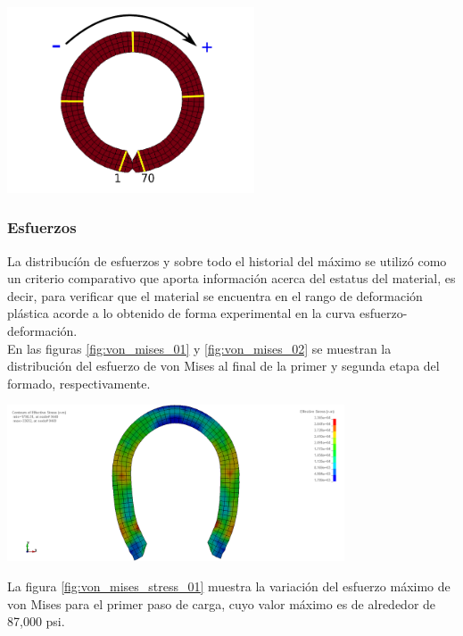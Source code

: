 \begin{center}
\includegraphics[width=0.55\textwidth]{src/ch4/numerate.pdf}
\label{fig:numerate}
\end{center}

\subsubsection{Esfuerzos}

La distribucíón de esfuerzos y sobre todo el historial del máximo se utilizó como 
un criterio comparativo  que aporta información acerca del estatus del material, 
es decir, para verificar que el material se encuentra en el rango de deformación 
plástica acorde a lo obtenido de forma experimental en la curva esfuerzo-deformación.\\

En las figuras \ref{fig:von_mises_01} y \ref{fig:von_mises_02} se muestran la 
distribución del esfuerzo de von Mises al final de la primer y segunda etapa 
del formado, respectivamente. 

\begin{center}
\includegraphics[width=0.75\textwidth]{src/ch4/von_mises_01.png}
\label{fig:von_mises_01}
\end{center}

La figura \ref{fig:von_mises_stress_01} muestra la variación del esfuerzo máximo 
de von Mises para el primer paso de carga, cuyo valor máximo es de alrededor de 87,000 psi.


